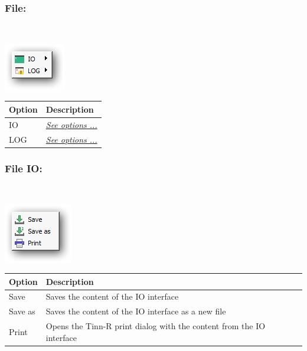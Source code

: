 \hypertarget{menu_r_term_file}{}
\subsubsection{File:}\\

\includegraphics[scale=0.8]{./res/menu_r_term_IOandLog.png}\\

\begin{scriptsize}
  \begin{tabularx}{\textwidth}{>{\hsize=0.3\hsize}X>{\hsize=0.7\hsize}X}\\
    \hline
    \textbf{Option} & \textbf{Description} \\
    \hline
    IO & \textit{\href{\#menu\_r\_term\_file\_IO}{See options ...}} \\
    LOG & \textit{\href{\#menu\_r\_term\_file\_Log}{See options ...}} \\
    \hline
  \end{tabularx}
\end{scriptsize}

\hypertarget{menu_r_term_file_IO}{}
\subsubsection{File IO:}\\

\includegraphics[scale=0.8]{./res/menu_r_term_file_IOandLog.png}\\

\begin{scriptsize}
  \begin{tabularx}{\textwidth}{>{\hsize=0.3\hsize}X>{\hsize=0.7\hsize}X}\\
    \hline
    \textbf{Option} & \textbf{Description} \\
    \hline
    Save & Saves the content of the IO interface \\
    Save as & Saves the content of the IO interface as a new file \\
    Print & Opens the Tinn-R print dialog with the content from the IO interface \\
    \hline
  \end{tabularx}
\end{scriptsize}

